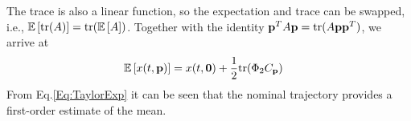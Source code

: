 The trace is also a linear function, so the expectation and trace can be swapped, i.e., $\mathbb{E}\left[\mathrm{tr}(A)\right] = \mathrm{tr}(\mathbb{E}\left[A\right])$. Together with the identity $\mathbf{p}^TA\mathbf{p} = \mathrm{tr}(A\mathbf{p}\mathbf{p}^T)$, we arrive at
\begin{align}
	 	\mathbb{E}\left[x(t,\mathbf{p})\right] &= x(t,\mathbf{0}) + \frac{1}{2}\mathrm{tr}(\Phi_2C_{\mathbf{p}}) \label{Eq:TaylorExp}
\end{align}
From Eq.\eqref{Eq:TaylorExp} it can be seen that the nominal trajectory provides a first-order estimate of the mean. 



